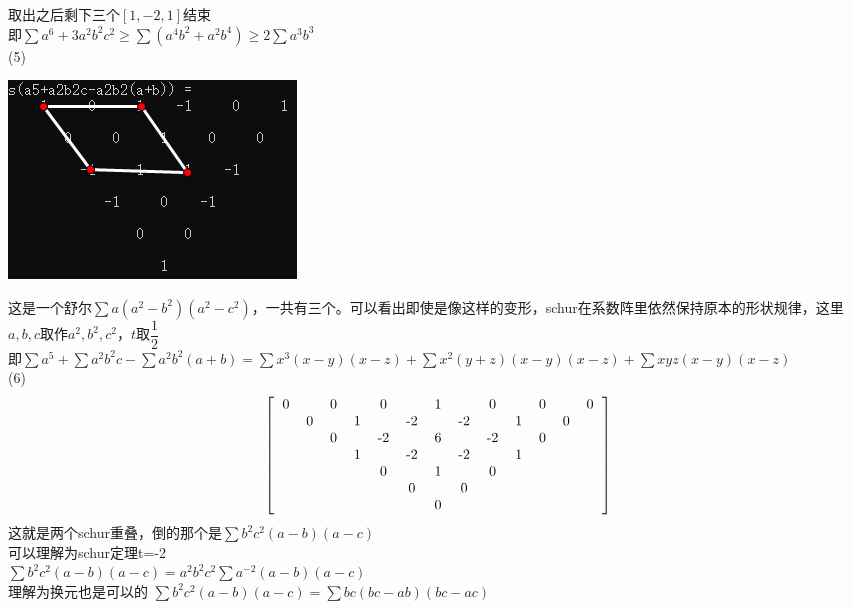 \documentclass[UTF8]{ctexart}
\begin{document}
取出之后剩下三个$ [1,-2,1] $结束\\
即$\displaystyle  \sum  a^{6}+3 a^{2} b^{2} c^{2} \geq \displaystyle  \sum (a^{4}b^{2}+a^{2}b^{4}) \geq 2 \displaystyle  \sum  a^{3} b^{3}$\\
(5)\begin{center}
	\includegraphics[width=0.5\linewidth]{240}
\end{center}
这是一个舒尔$ \displaystyle  \sum a(a^{2}-b^{2})(a^{2}-c^{2}) $，一共有三个。可以看出即使是像这样的变形，schur在系数阵里依然保持原本的形状规律，这里$ a,b,c $取作$ a^{2},b^{2},c^{2} $，$ t $取$ \dfrac{1}{2} $\\
即$\displaystyle  \sum a^{5}+\displaystyle  \sum  a^{2} b^{2} c -\displaystyle  \sum a^{2} b^{2}(a+b)=\displaystyle  \sum x^{3}(x-y)(x-z)+\displaystyle  \sum x^{2}(y+z)(x-y)(x-z)+\displaystyle  \sum xyz(x-y)(x-z)$\\
(6)\renewcommand*{\arraystretch}{1.732}\[\left[\begin{matrix}
	\begin{tabular}{ccccccccccccc}
		0& &0& &0& &1& &0& &0& &0\\
		&0& &1& &-2& &-2& &1& &0&\\
		& &0& &-2& &6& &-2& &0& &\\
		& & &1& &-2& &-2& &1& & &\\
		& & & &0& &1& &0& & & &\\
		& & & & &0& &0& & & & &\\
		& & & & & &0& & & & & &\\
	\end{tabular}
\end{matrix}\right]\]
这就是两个schur重叠，倒的那个是$ \displaystyle  \sum b^{2}c^{2}(a-b)(a-c) $\\
可以理解为schur定理t=-2\\
$\displaystyle  \sum  b^{2} c^{2}(a-b)(a-c)=a^{2} b^{2} c^{2} \displaystyle  \sum  a^{-2}(a-b)(a-c) $\\
理解为换元也是可以的
$\displaystyle  \sum b^{2} c^{2}(a-b)(a-c)=\displaystyle  \sum b c(b c-a b)(b c-a c)$\\
\end{document}
